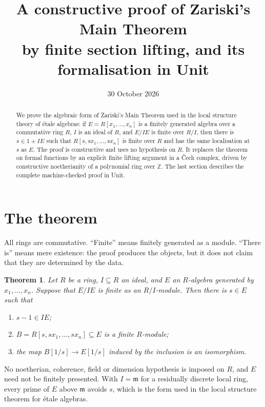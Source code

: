 \documentclass[11pt]{amsart}
\title[Zariski's Main Theorem by finite section lifting]{A constructive proof of
Zariski's Main Theorem\\ by finite section lifting, and its formalisation in Unit}
\date{30 October 2026}
\numberwithin{equation}{section}
\newtheorem{theorem}{Theorem}[section]
\theoremstyle{definition}
\theoremstyle{remark}
\newcommand{\ZZ}{\mathbb Z}
\begin{document}
\sloppy
\begin{abstract}
We prove the algebraic form of Zariski's Main Theorem used in the
local structure theory of \'etale algebras: if $E=R[x_1,\ldots,x_n]$ is
a finitely generated algebra over a commutative ring $R$, $I$ is an
ideal of $R$, and $E/IE$ is finite over $R/I$, then there is
$s\in1+IE$ such that $R[s,sx_1,\ldots,sx_n]$ is finite over $R$ and
has the same localisation at $s$ as $E$. The proof is constructive and
uses no hypothesis on $R$. It replaces the theorem on formal functions
by an explicit finite lifting argument in a \v Cech complex, driven by
constructive noetherianity of a polynomial ring over $\ZZ$. The last
section describes the complete machine-checked proof in Unit.
\end{abstract}
\maketitle


\section{The theorem}

All rings are commutative. ``Finite'' means finitely generated as a
module. ``There is'' means mere existence: the proof produces the
objects, but it does not claim that they are determined by the data.

\begin{theorem}\label{thm:main}
Let $R$ be a ring, $I\subseteq R$ an ideal, and $E$ an $R$-algebra
generated by $x_1,\ldots,x_n$. Suppose that $E/IE$ is finite as an
$R/I$-module. Then there is $s\in E$ such that
\begin{enumerate}
\item $s-1\in IE$;
\item $B=R[s,sx_1,\ldots,sx_n]\subseteq E$ is a finite $R$-module;
\item the map $B[1/s]\to E[1/s]$ induced by the inclusion is an
isomorphism.
\end{enumerate}
\end{theorem}

No noetherian, coherence, field or dimension hypothesis is imposed on
$R$, and $E$ need not be finitely presented. With $I=\mathfrak m$ for
a residually discrete local ring, every prime of $E$ above $\mathfrak m$
avoids $s$, which is the form used in the local structure theorem for
\'etale algebras.
\end{document}
